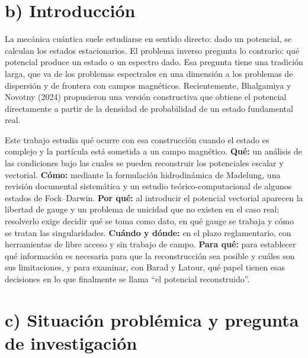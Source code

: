 \documentclass[12pt,letterpaper]{article}
\begin{document}
\section*{b) Introducción}
La mecánica cuántica suele estudiarse en sentido directo: dado un potencial, se calculan los estados estacionarios. El
problema inverso pregunta lo contrario: qué potencial produce un estado o un espectro dado. Esa pregunta tiene una
tradición larga, que va de los problemas espectrales en una dimensión a los problemas de dispersión y de frontera con
campos magnéticos. Recientemente, Bhalgamiya y Novotny (2024) propusieron una versión constructiva que obtiene el
potencial directamente a partir de la densidad de probabilidad de un estado fundamental real.

Este trabajo estudia qué ocurre con esa construcción cuando el estado es complejo y la partícula está sometida a un campo
magnético. \textbf{Qué:} un análisis de las condiciones bajo las cuales se pueden reconstruir los potenciales escalar y
vectorial. \textbf{Cómo:} mediante la formulación hidrodinámica de Madelung, una revisión documental sistemática y un
estudio teórico-computacional de algunos estados de Fock--Darwin. \textbf{Por qué:} al introducir el potencial vectorial
aparecen la libertad de gauge y un problema de unicidad que no existen en el caso real; resolverlo exige decidir qué se
toma como dato, en qué gauge se trabaja y cómo se tratan las singularidades. \textbf{Cuándo y dónde:} en el plazo
reglamentario, con herramientas de libre acceso y sin trabajo de campo. \textbf{Para qué:} para establecer qué
información es necesaria para que la reconstrucción sea posible y cuáles son sus limitaciones, y para examinar, con
Barad y Latour, qué papel tienen esas decisiones en lo que finalmente se llama ``el potencial reconstruido''.

\section*{c) Situación problémica y pregunta de investigación}
\end{document}
